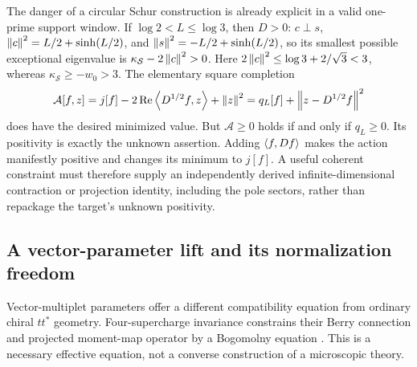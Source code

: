 The danger of a circular Schur construction is already explicit in a
valid one-prime support window.  If $\log2<L\le\log3$, then $D>0$:
$c\perp s$,
$\left\lVert c\right\rVert^2=L/2+\sinh(L/2)$, and
$\left\lVert s\right\rVert^2=-L/2+\sinh(L/2)$, so its smallest possible exceptional
eigenvalue is $\kappa_{\mathcal S}-2\left\lVert c\right\rVert^2>0$.
Here $2\left\lVert c\right\rVert^2\le\log3+2/\sqrt3<3$, whereas
$\kappa_{\mathcal S}\ge-w_0>3$.
The elementary square completion
\begin{equation}
 \mathcal A[f,z]=j[f]-2\operatorname{Re}\left\langle D^{1/2}f,z\right\rangle+\left\lVert z\right\rVert^2
 =q_L[f]+\left\lVert z-D^{1/2}f\right\rVert^2
 \label{obs-circular-schur}
\end{equation}
does have the desired minimized value.  But $\mathcal A\ge0$ holds if and
only if $q_L\ge0$.  Its positivity is exactly the unknown assertion.
Adding $\left\langle f,Df\right\rangle$ makes the action manifestly positive and changes its
minimum to $j[f]$.  A useful coherent constraint must therefore supply an
independently derived infinite-dimensional contraction or projection
identity, including the pole sectors, rather than repackage the target's
unknown positivity.

\subsection{A vector-parameter lift and its normalization freedom}

Vector-multiplet parameters offer a different compatibility equation from
ordinary chiral $tt^*$ geometry.  Four-supercharge invariance constrains
their Berry connection and projected moment-map operator by a Bogomolny
equation \cite{SonnerTong}.  This is a necessary effective equation, not a
converse construction of a microscopic theory.

